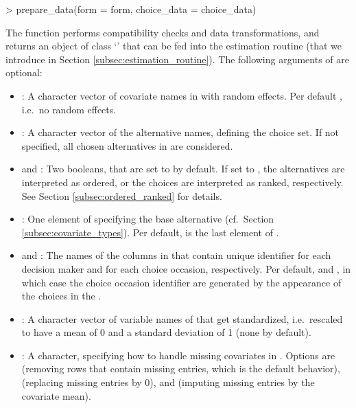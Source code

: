 \documentclass[article,shortnames]{jss}
\newcommand{\class}[1]{`\code{#1}'}
\newcommand{\fct}[1]{\code{#1()}}
\begin{document}
\begin{Schunk}
\begin{Sinput}
> prepare_data(form = form, choice_data = choice_data)
\end{Sinput}
\end{Schunk}

The function performs compatibility checks and data transformations, and returns an object of class \class{RprobitB\_data} that can be fed into the estimation routine \fct{fit\_model} (that we introduce in Section \ref{subsec:estimation_routine}). The following arguments of \fct{prepare\_data} are optional:
\begin{itemize}
  \item {}: A character vector of covariate names in  with random effects. Per default , i.e.\ no random effects.
  \item {}: A character vector of the alternative names, defining the choice set. If not specified, all chosen alternatives in  are considered.
  \item {} and : Two booleans, that are set to  by default. If set to , the alternatives are interpreted as ordered, or the choices are interpreted as ranked, respectively. See Section \ref{subsec:ordered_ranked} for details.
  \item {}: One element of  specifying the base alternative (cf.\ Section \ref{subsec:covariate_types}). Per default,  is the last element of .
  \item {} and : The names of the columns in  that contain unique identifier for each decision maker and for each choice occasion, respectively. Per default,  and , in which case the choice occasion identifier are generated by the appearance of the choices in the .
  \item {}: A character vector of variable names of  that get standardized, i.e.\ rescaled to have a mean of 0 and a standard deviation of 1 (none by default).
  \item {}: A character, specifying how to handle missing covariates in . Options are  (removing rows that contain missing entries, which is the default behavior),  (replacing missing entries by 0), and  (imputing missing entries by the covariate mean).
\end{itemize}
\end{document}
